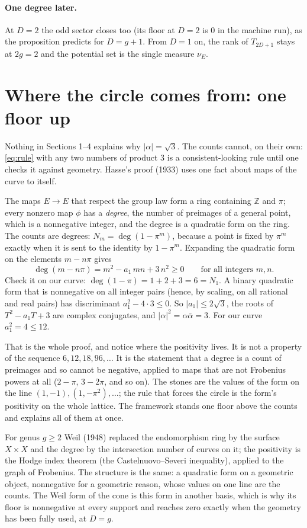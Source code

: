 \documentclass[11pt]{article}
\newcommand{\Z}{\mathbb Z}
\newcommand{\abar}{\bar\alpha}
\begin{document}
\paragraph{One degree later.} At $D=2$ the odd sector closes too (its floor at $D=2$ is $0$ in the machine run), as the proposition predicts for $D=g+1$. From $D=1$ on, the rank of $T_{2D+1}$ stays at $2g=2$ and the potential set is the single measure $\nu_E$.

\section{Where the circle comes from: one floor up}

Nothing in Sections 1--4 explains why $|\alpha|=\sqrt3$. The counts cannot, on their own: \eqref{eq:rule} with any two numbers of product $3$ is a consistent-looking rule until one checks it against geometry. Hasse's proof (1933) uses one fact about maps of the curve to itself.

The maps $E\to E$ that respect the group law form a ring containing $\Z$ and $\pi$; every nonzero map $\phi$ has a \emph{degree}, the number of preimages of a general point, which is a nonnegative integer, and the degree is a quadratic form on the ring. The counts are degrees: $N_m=\deg(1-\pi^m)$, because a point is fixed by $\pi^m$ exactly when it is sent to the identity by $1-\pi^m$. Expanding the quadratic form on the elements $m-n\pi$ gives
\[
\deg(m-n\pi)=m^2-a_1\,mn+3\,n^2\geq0\qquad\text{for all integers }m,n .
\]
Check it on our curve: $\deg(1-\pi)=1+2+3=6=N_1$. A binary quadratic form that is nonnegative on all integer pairs (hence, by scaling, on all rational and real pairs) has discriminant $a_1^2-4\cdot3\le0$. So $|a_1|\le2\sqrt3$, the roots of $T^2-a_1T+3$ are complex conjugates, and $|\alpha|^2=\alpha\abar=3$. For our curve $a_1^2=4\le12$.

That is the whole proof, and notice where the positivity lives. It is not a property of the sequence $6,12,18,96,\dots$ It is the statement that a degree is a count of preimages and so cannot be negative, applied to maps that are not Frobenius powers at all ($2-\pi$, $3-2\pi$, and so on). The stones are the values of the form on the line $(1,-1),(1,-\pi^2),\dots$; the rule that forces the circle is the form's positivity on the whole lattice. The framework stands one floor above the counts and explains all of them at once.

For genus $g\geq2$ Weil (1948) replaced the endomorphism ring by the surface $X\times X$ and the degree by the intersection number of curves on it; the positivity is the Hodge index theorem (the Castelnuovo--Severi inequality), applied to the graph of Frobenius. The structure is the same: a quadratic form on a geometric object, nonnegative for a geometric reason, whose values on one line are the counts. The Weil form of the cone is this form in another basis, which is why its floor is nonnegative at every support and reaches zero exactly when the geometry has been fully used, at $D=g$.
\end{document}

